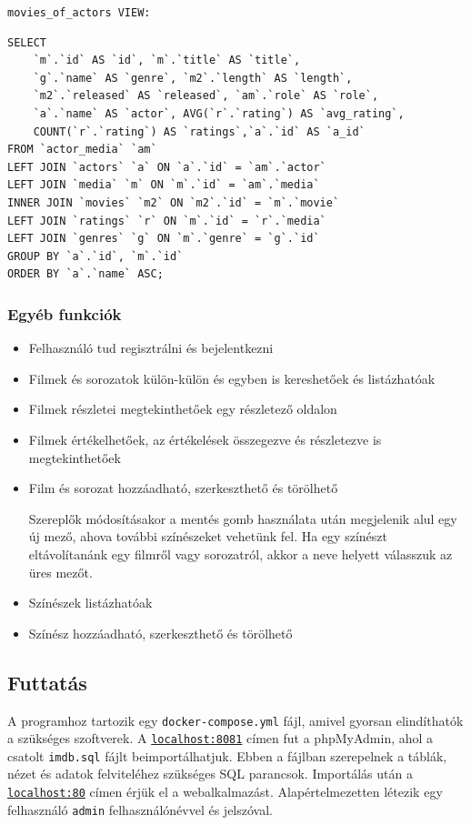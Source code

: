 \documentclass[12pt,a4paper,titlepage]{article}  %
\begin{document}
\bigskip

\noindent \texttt{movies\_of\_actors VIEW:}
\begin{verbatim}
SELECT 
	`m`.`id` AS `id`, `m`.`title` AS `title`,
	`g`.`name` AS `genre`, `m2`.`length` AS `length`,
	`m2`.`released` AS `released`, `am`.`role` AS `role`,
	`a`.`name` AS `actor`, AVG(`r`.`rating`) AS `avg_rating`,
	COUNT(`r`.`rating`) AS `ratings`,`a`.`id` AS `a_id` 
FROM `actor_media` `am`
LEFT JOIN `actors` `a` ON `a`.`id` = `am`.`actor`
LEFT JOIN `media` `m` ON `m`.`id` = `am`.`media`
INNER JOIN `movies` `m2` ON `m2`.`id` = `m`.`movie`
LEFT JOIN `ratings` `r` ON `m`.`id` = `r`.`media`
LEFT JOIN `genres` `g` ON `m`.`genre` = `g`.`id`
GROUP BY `a`.`id`, `m`.`id`
ORDER BY `a`.`name` ASC;
\end{verbatim}


\subsubsection{Egyéb funkciók}

\begin{itemize}
	\item Felhasználó tud regisztrálni és bejelentkezni
	\item Filmek és sorozatok külön-külön és egyben is kereshetőek és listázhatóak
	\item Filmek részletei megtekinthetőek egy részletező oldalon
	\item Filmek értékelhetőek, az értékelések összegezve és részletezve is megtekinthetőek
	\item Film és sorozat hozzáadható, szerkeszthető és törölhető
	
	Szereplők módosításakor a mentés gomb használata után megjelenik alul egy új mező, ahova további színészeket vehetünk fel. Ha egy színészt eltávolítanánk egy filmről vagy sorozatról, akkor a neve helyett válasszuk az üres mezőt.
	
	\item Színészek listázhatóak
	\item Színész hozzáadható, szerkeszthető és törölhető
	
\end{itemize}

\subsection{Futtatás}

A programhoz tartozik egy \texttt{docker-compose.yml} fájl, amivel gyorsan elindíthatók a szükséges szoftverek. A \href{http://localhost:8081}{\texttt{localhost:8081}} címen fut a phpMyAdmin, ahol a csatolt \texttt{imdb.sql} fájlt beimportálhatjuk. Ebben a fájlban szerepelnek a táblák, nézet és adatok felviteléhez szükséges SQL parancsok. Importálás után a \href{http://localhost}{\texttt{localhost:80}} címen érjük el a webalkalmazást. Alapértelmezetten létezik egy felhasználó \texttt{admin} felhasználónévvel és jelszóval.



	
\end{document}
